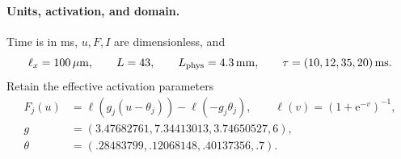 \documentclass[11pt]{article}
\newcommand{\ee}{\mathrm{e}}
\begin{document}
\paragraph{Units, activation, and domain.}
Time is in ms, $u,F,I$ are dimensionless, and
\begin{equation}
 \ell_x=100\,\mu\mathrm m,\qquad L=43,\qquad
 L_{\rm phys}=4.3\,\mathrm{mm},\qquad
 \tau=(10,12,35,20)\,\mathrm{ms}.
 \label{eq:v1-unit-convention}
\end{equation}
Retain the effective activation parameters
\begin{equation}
 \begin{split}
 F_j(u)&=\ell(g_j(u-\theta_j))-\ell(-g_j\theta_j),\qquad
 \ell(v)=(1+\ee^{-v})^{-1},\\
 g&=(3.47682761,7.34413013,3.74650527,6),\\
 \theta&=(.28483799,.12068148,.40137356,.7).
 \end{split}
 \label{eq:v1-activation}
\end{equation}
\end{document}
